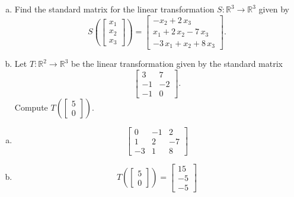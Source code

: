 
\begin{exerciseStatement}

\begin{enumerate}[(a)]
\item Find the standard matrix for the linear transformation \(S:\mathbb{R}^ 3  \to \mathbb{R}^ 3 \) given by \[S\left(  \left[\begin{array}{c}
x_{1} \\
x_{2} \\
x_{3}
\end{array}\right]  \right) =  \left[\begin{array}{c}
-x_{2} + 2 \, x_{3} \\
x_{1} + 2 \, x_{2} - 7 \, x_{3} \\
-3 \, x_{1} + x_{2} + 8 \, x_{3}
\end{array}\right] .\]
\item Let \(T:\mathbb{R}^ 2  \to \mathbb{R}^ 3 \) be the linear transformation given by the standard matrix \[ \left[\begin{array}{cc}
3 & 7 \\
-1 & -2 \\
-1 & 0
\end{array}\right] .\] Compute \(T\left( \left[\begin{array}{c}
5 \\
0
\end{array}\right]  \right)\). 
\end{enumerate}
    
\end{exerciseStatement}
    
\begin{exerciseAnswer} 

\begin{enumerate}[(a)]
\item \[ \left[\begin{array}{ccc}
0 & -1 & 2 \\
1 & 2 & -7 \\
-3 & 1 & 8
\end{array}\right] \]
\item \[T\left( \left[\begin{array}{c}
5 \\
0
\end{array}\right]  \right)= \left[\begin{array}{c}
15 \\
-5 \\
-5
\end{array}\right] \]
\end{enumerate}
    
\end{exerciseAnswer}
    
